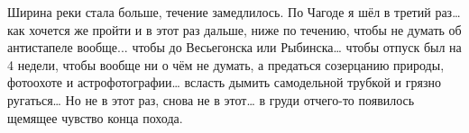Ширина реки стала больше, течение замедлилось. По Чагоде я шёл в третий раз… как хочется же пройти и в этот раз дальше, ниже по течению, чтобы не думать об антистапеле вообще... чтобы до Весьегонска или Рыбинска… чтобы отпуск был на 4 недели, чтобы вообще ни о чём не думать, а предаться созерцанию природы, фотоохоте и астрофотографии… всласть дымить самодельной трубкой и грязно ругаться… Но не в этот раз, снова не в этот… в груди отчего-то появилось щемящее чувство конца похода.

\begin{center}
\end{center}
